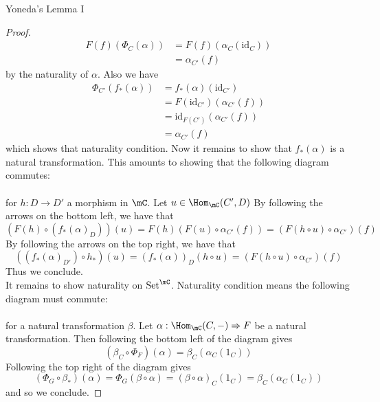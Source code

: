\documentclass[a4paper]{article}
\begin{document}
\begin{thm}{Yoneda's Lemma I}{}
\begin{proof}
\begin{align*}
F(f)(\Phi_C(\alpha))&=F(f)(\alpha_C(\text{id}_C))\\
&=\alpha_{C'}(f)
\end{align*}
by the naturality of $\alpha$. Also we have 
\begin{align*}
\Phi_{C'}(f_\ast(\alpha))&=f_\ast(\alpha)(\text{id}_{C'})\\
&=F(\text{id}_{C'})(\alpha_{C'}(f))\\
&=\text{id}_{F(C')}(\alpha_{C'}(f))\\
&=\alpha_{C'}(f)
\end{align*}
which shows that naturality condition. Now it remains to show that $f_\ast(\alpha)$ is a natural transformation. This amounts to showing that the following diagram commutes: \\
\\
for $h:D\to D'$ a morphism in $\mC$. Let $u\in\Hom_\mC(C',D)$ By following the arrows on the bottom left, we have that $$(F(h)\circ(f_\ast(\alpha)_D))(u)=F(h)\left(F(u)\circ\alpha_{C'}(f)\right)=\left(F(h\circ u)\circ\alpha_{C'}\right)(f)$$ By following the arrows on the top right, we have that $$((f_\ast(\alpha)_{D'})\circ h_\ast)(u)=(f_\ast(\alpha))_D(h\circ u)=\left(F(h\circ u)\circ\alpha_{C'}\right)(f)$$ Thus we conclude. \\

It remains to show naturality on $\text{Set}^\mC$. Naturality condition means the following diagram must commute: \\
\\
for a natural transformation $\beta$. Let $\alpha:\Hom_\mC(C,-)\Rightarrow F$ be a natural transformation. Then following the bottom left of the diagram gives $$(\beta_C\circ\Phi_F)(\alpha)=\beta_C(\alpha_C(1_C))$$ Following the top right of the diagram gives $$(\Phi_G\circ\beta_\ast)(\alpha)=\Phi_G(\beta\circ\alpha)=(\beta\circ\alpha)_C(1_C)=\beta_C(\alpha_C(1_C))$$ and so we conclude. 
\end{proof}
\end{thm}
\end{document}
